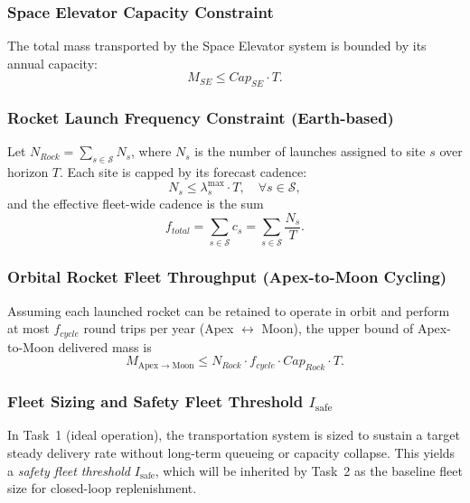 ﻿\documentclass{mcmthesis}
\begin{document}
\subsubsection{Space Elevator Capacity Constraint}
The total mass transported by the Space Elevator system is bounded by its annual capacity:
\begin{equation}
M_{SE} \le Cap_{SE}\cdot T.
\end{equation}

\subsubsection{Rocket Launch Frequency Constraint (Earth-based)}
Let $N_{Rock}=\sum_{s\in\mathcal{S}} N_s$, where $N_s$ is the number of launches assigned to site $s$ over horizon $T$.
Each site is capped by its forecast cadence:
\begin{equation}
N_s \le \lambda_s^{\text{max}}\cdot T,\quad \forall s\in\mathcal{S},
\end{equation}
and the effective fleet-wide cadence is the sum
\begin{equation}
f_{total}=\sum_{s\in\mathcal{S}} c_s=\sum_{s\in\mathcal{S}} \frac{N_s}{T}.
\end{equation}

\subsubsection{Orbital Rocket Fleet Throughput (Apex-to-Moon Cycling)}
Assuming each launched rocket can be retained to operate in orbit and perform at most
$f_{cycle}$ round trips per year (Apex $\leftrightarrow$ Moon), the upper bound of
Apex-to-Moon delivered mass is
\begin{equation}
M_{\mathrm{Apex\rightarrow Moon}} \le N_{Rock}\cdot f_{cycle}\cdot Cap_{Rock}\cdot T.
\end{equation}
\subsubsection{Fleet Sizing and Safety Fleet Threshold $I_{\text{safe}}$}
\label{sec:fleet_sizing}

In Task~1 (ideal operation), the transportation system is sized to sustain a target
steady delivery rate without long-term queueing or capacity collapse. This yields a
\emph{safety fleet threshold} $I_{\text{safe}}$, which will be inherited by Task~2 as the
baseline fleet size for closed-loop replenishment.
\end{document}
